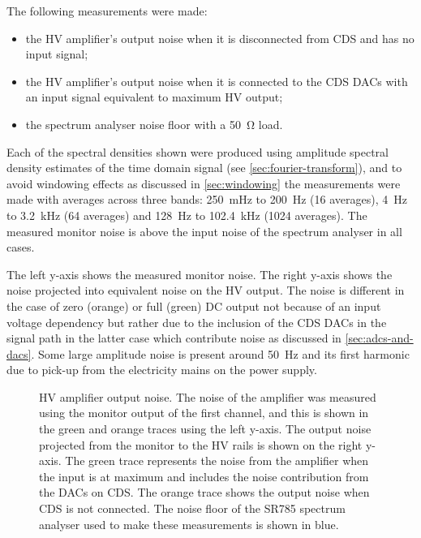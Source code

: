 The following measurements were made:
\begin{itemize}
  \item the \gls{HV} amplifier's output noise when it is disconnected from \gls{CDS} and has no input signal;
  \item the \gls{HV} amplifier's output noise when it is connected to the \gls{CDS} \glspl{DAC} with an input signal equivalent to maximum \gls{HV} output;
  \item the spectrum analyser noise floor with a \SI{50}{\ohm} load.
\end{itemize}
Each of the spectral densities shown were produced using amplitude spectral density estimates of the time domain signal (see \cref{sec:fourier-transform}), and to avoid windowing effects as discussed in \cref{sec:windowing} the measurements were made with averages across three bands: \SI{250}{\milli\hertz} to \SI{200}{\hertz} (\num{16} averages), \SI{4}{\hertz} to \SI{3.2}{\kilo\hertz} (\num{64} averages) and \SI{128}{\hertz} to \SI{102.4}{\kilo\hertz} (\num{1024} averages). The measured monitor noise is above the input noise of the spectrum analyser in all cases.

The left y-axis shows the measured monitor noise. The right y-axis shows the noise projected into equivalent noise on the \gls{HV} output. The noise is different in the case of zero (orange) or full (green) \gls{DC} output not because of an input voltage dependency but rather due to the inclusion of the \gls{CDS} \glspl{DAC} in the signal path in the latter case which contribute noise as discussed in \cref{sec:adcs-and-dacs}. Some large amplitude noise is present around \SI{50}{\hertz} and its first harmonic due to pick-up from the electricity mains on the power supply.

\begin{figure}[htp]
  \centering
  
  \caption[High voltage amplifier output noise]{\gls{HV} amplifier output noise. The noise of the amplifier was measured using the monitor output of the first channel, and this is shown in the green and orange traces using the left y-axis. The output noise projected from the monitor to the \gls{HV} rails is shown on the right y-axis. The green trace represents the noise from the amplifier when the input is at maximum and includes the noise contribution from the \glspl{DAC} on \gls{CDS}. The orange trace shows the output noise when \gls{CDS} is not connected. The noise floor of the SR785 spectrum analyser used to make these measurements is shown in blue.}
  \label{fig:hv-amp-output-noise}
\end{figure}


